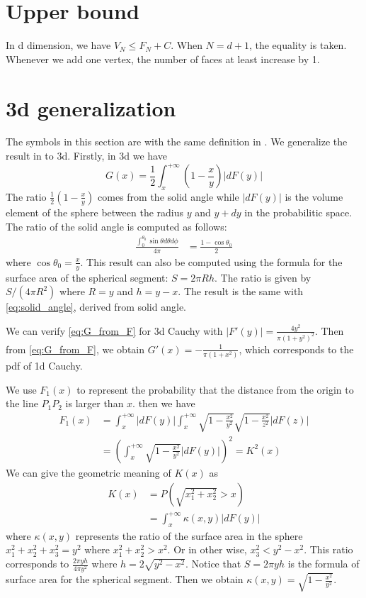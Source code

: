 \documentclass{article}
\begin{document}
\section{Upper bound}
In d dimension, we have
$V_N \leq F_N   + C$.
When $N=d+1$, the equality is taken.
Whenever we add one vertex, the number of faces
at least increase by 1.

\section{3d generalization}
The symbols in this section are with the same definition in \cite{carnal1970konvexe}.
We generalize the result in \cite{carnal1970konvexe} to 3d.
Firstly, in 3d we have
\begin{equation}\label{eq:G_from_F}
    G(x) = \frac{1}{2} \int_x^{+\infty} (1-\frac{x}{y}) |dF(y)|
\end{equation}
The ratio $\frac{1}{2} (1-\frac{x}{y})$
comes from the solid angle while $|dF(y)|$
is the volume element of the sphere between the radius
$y$ and $y+dy$ in the probabilitic space.
The ratio of the solid angle is computed as follows:
\begin{align}\label{eq:solid_angle}
    \frac{\int_0^{\theta_0} \sin\theta d\theta d\phi}
    {4\pi} & = \frac{1-\cos \theta_0}{2}
\end{align} 
where $\cos\theta_0=\frac{x}{y}$.
This result can also be computed
using the formula for the surface area of
the spherical segment: $S=2\pi R h$. The ratio is given by
$S/(4\pi R^2)$ where $R=y$ and $h=y-x$. The result is the same
with \eqref{eq:solid_angle},
derived from solid angle.

We can verify \eqref{eq:G_from_F} for 3d Cauchy with
$|F'(y)|=\frac{4y^2}{\pi(1+y^2)^2}$.
Then from \eqref{eq:G_from_F}, 
we obtain $G'(x)=-\frac{1}{\pi (1+x^2)}$, which corresponds to
the pdf of 1d Cauchy.

We use $F_1(x)$ to represent the probability that
the distance from the origin to the line $P_1P_2$
is larger than $x$.
then we have
\begin{align}
    F_1(x) & =\int_x^{+\infty} |dF(y)|
    \int_x^{+\infty}  \sqrt{1-\frac{x^2}{y^2}} \sqrt{1-\frac{x^2}{z^2}}
    |dF(z)| \\
    & = \left(\int_x^{+\infty} \sqrt{1-\frac{x^2}{y^2}}
    |d F(y)| \right)^2 = K^2(x)
    \label{eq:form_F_1_x}
\end{align}
We can give the geometric meaning of $K(x)$
as 
\begin{align}
K(x) &=P(\sqrt{x_1^2+x_2^2}>x)\\
&=\int_x^{+\infty} \kappa(x,y) |dF(y)|
\end{align}
where $\kappa(x,y)$ represents the ratio of the surface
area in the sphere $x_1^2+x_2^2+x_3^2=y^2$ where $x_1^2+x_2^2>x^2$.
Or in other wise, $x_3^2<y^2-x^2$. This ratio corresponds to
$\frac{2\pi y h}{4\pi y^2}$ where $h=2\sqrt{y^2-x^2}$.
Notice that $S=2\pi y h$ is the formula of surface area for the spherical segment.
Then we obtain $\kappa(x,y)=\sqrt{1-\frac{x^2}{y^2}}$.
\end{document}
